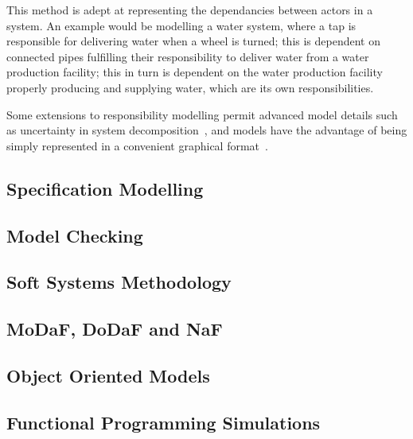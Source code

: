 This method is adept at representing the dependancies between actors in a
system. An example would be modelling a water system, where a tap is responsible
for delivering water when a wheel is turned; this is dependent on connected
pipes fulfilling their responsibility to deliver water from a water production
facility; this in turn is dependent on the water production facility properly
producing and supplying water, which are its own responsibilities.
\par

Some extensions to responsibility modelling permit advanced model details such
as uncertainty in system decomposition~\cite{simpson2017formalised}, and models
have the advantage of being simply represented in a convenient graphical
format~\cite{storer2008modelling}.

\subsection{Specification Modelling}


\subsection{Model Checking}


\subsection{Soft Systems Methodology}




\subsection{MoDaF, DoDaF and NaF}


\subsection{Object Oriented Models}


\subsection{Functional Programming Simulations}


